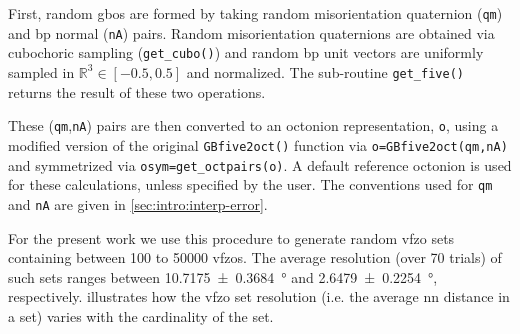 \documentclass[final,twocolumn,12pt]{elsarticle}
\begin{document}
First, random \glspl{gbo} are formed by taking random misorientation quaternion (\texttt{qm}) and \gls{bp} normal (\texttt{nA}) pairs. Random misorientation quaternions are obtained via cubochoric sampling \cite{singhOrientationSamplingDictionarybased2016} (\texttt{get\_cubo()}) and random \gls{bp} unit vectors are uniformly sampled in $\mathbb{R}^3 \in [-0.5,0.5]$ and normalized. The sub-routine \texttt{get\_five()} returns the result of these two operations. 

These (\texttt{qm},\texttt{nA}) pairs are then converted to an octonion representation, \texttt{o}, using a modified version \cite{bairdFiveDegreeofFreedom5DOF2020} of the original \texttt{GBfive2oct()} function \cite{chesserGBOctonionCode2019} via \texttt{o=GBfive2oct(qm,nA)} and symmetrized via \texttt{osym=get\_octpairs(o)}. A default reference octonion is used for these calculations, unless specified by the user. The conventions used for \texttt{qm} and \texttt{nA} are given in \cref{sec:intro:interp-error}.

For the present work we use this procedure to generate random \gls{vfzo} sets containing between \num{100} to \num{50000} \glspl{vfzo}. The average resolution (over 70 trials) of such sets ranges between \SI{10.7175 \pm 0.3684}{\degree} and \SI{2.6479 \pm 0.2254}{\degree}, respectively.  illustrates how the \gls{vfzo} set resolution (i.e. the average \gls{nn} distance in a set) varies with the cardinality of the set. 
\end{document}
